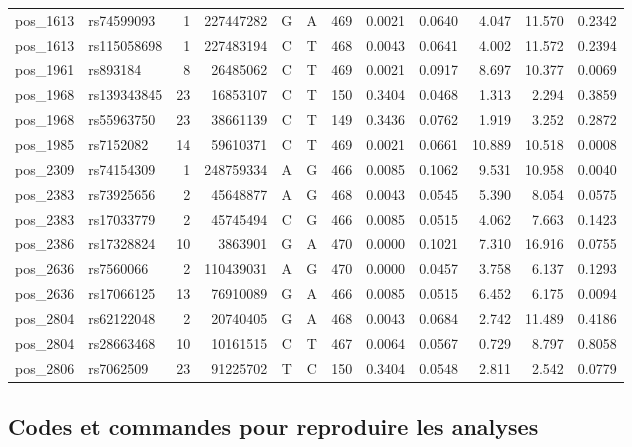 \documentclass[11pt,a4paper]{article}
\begin{document}
\begin{table}[h!]
\begin{tabular}{llrrccrrrrrr}
    pos\_1613 & rs74599093  & 1  & 227447282 & G & A & 469 & 0.0021 & 0.0640 & 4.047  & 11.570 & 0.2342 \\
    pos\_1613 & rs115058698 & 1  & 227483194 & C & T & 468 & 0.0043 & 0.0641 & 4.002  & 11.572 & 0.2394 \\
    pos\_1961 & rs893184    & 8  & 26485062  & C & T & 469 & 0.0021 & 0.0917 & 8.697  & 10.377 & 0.0069 \\
    pos\_1968 & rs139343845 & 23 & 16853107  & C & T & 150 & 0.3404 & 0.0468 & 1.313  & 2.294  & 0.3859 \\
    pos\_1968 & rs55963750  & 23 & 38661139  & C & T & 149 & 0.3436 & 0.0762 & 1.919  & 3.252  & 0.2872 \\
    pos\_1985 & rs7152082   & 14 & 59610371  & C & T & 469 & 0.0021 & 0.0661 & 10.889 & 10.518 & 0.0008 \\
    pos\_2309 & rs74154309  & 1  & 248759334 & A & G & 466 & 0.0085 & 0.1062 & 9.531  & 10.958 & 0.0040 \\
    pos\_2383 & rs73925656  & 2  & 45648877  & A & G & 468 & 0.0043 & 0.0545 & 5.390  & 8.054  & 0.0575 \\
    pos\_2383 & rs17033779  & 2  & 45745494  & C & G & 466 & 0.0085 & 0.0515 & 4.062  & 7.663  & 0.1423 \\
    pos\_2386 & rs17328824  & 10 & 3863901   & G & A & 470 & 0.0000 & 0.1021 & 7.310  & 16.916 & 0.0755 \\
    pos\_2636 & rs7560066   & 2  & 110439031 & A & G & 470 & 0.0000 & 0.0457 & 3.758  & 6.137  & 0.1293 \\
    pos\_2636 & rs17066125  & 13 & 76910089  & G & A & 466 & 0.0085 & 0.0515 & 6.452  & 6.175  & 0.0094 \\
    pos\_2804 & rs62122048  & 2  & 20740405  & G & A & 468 & 0.0043 & 0.0684 & 2.742  & 11.489 & 0.4186 \\
    pos\_2804 & rs28663468  & 10 & 10161515  & C & T & 467 & 0.0064 & 0.0567 & 0.729  & 8.797  & 0.8058 \\
    pos\_2806 & rs7062509   & 23 & 91225702  & T & C & 150 & 0.3404 & 0.0548 & 2.811  & 2.542  & 0.0779 \\
    \bottomrule
  \end{tabular}
\end{table}


\newpage
\subsection{Codes et commandes pour reproduire les analyses}
\end{document}
